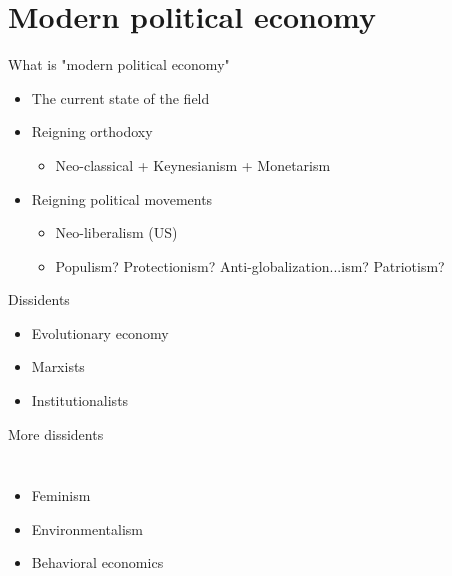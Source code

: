\documentclass{beamer}
\begin{document}
\section{Modern political economy} 

\begin{frame}{What is "modern political economy"}
	
\begin{itemize}
    \item The current state of the field \pause
    \item Reigning orthodoxy \pause
    \begin{itemize}
        \item Neo-classical + Keynesianism + Monetarism \pause
    \end{itemize}{}
    \item Reigning political movements \pause
    \begin{itemize}
        \item Neo-liberalism (US) \pause
        \item Populism? Protectionism? Anti-globalization...ism? Patriotism?
    \end{itemize}{}
\end{itemize}

\end{frame}{}

\begin{frame}{Dissidents} 
      \begin{itemize}
        \item Evolutionary economy \pause
        \item Marxists \pause
        \item Institutionalists 
      \end{itemize}
\end{frame}{}

\begin{frame}{More dissidents}
\begin{columns}[onlytextwidth]
\begin{itemize}
    \item Feminism %
    \item Environmentalism %
    \item Behavioral economics
\end{itemize}
\end{columns}
\end{frame}
\end{document}
